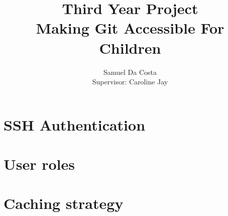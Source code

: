 \documentclass[a4paper]{report}
\begin{document}
\newcommand{\commit}[0]{\texttt{commit}}
\newcommand{\fig}[4]{

\begin{figure} 
    \centering
    \texttt{[image: \#1]}
    \caption{#2}
    \label{#3}
\end{figure}


}

\title{Third Year Project \\
\large Making Git Accessible For Children \\
}
\author{Samuel Da Costa\\
Supervisor: Caroline Jay}
\maketitle
\tableofcontents





\begin{appendices}

\chapter{SSH Authentication}\label{appendix_sshkeys}

\chapter{User roles}\label{appendix_users}

\chapter{Caching strategy}\label{appendix_caching}

\end{appendices}



\end{document}

